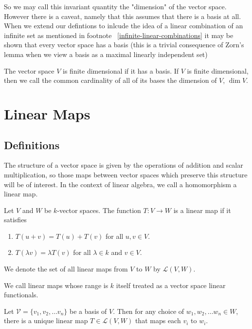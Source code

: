 \documentclass[]{article}
\begin{document}
So we may call this invariant quantity the "dimension" of the vector space. However there is a caveat, namely that this assumes that there is a basis at all. When we extend our defintions to inlcude the idea of a linear combination of an infinite set as mentioned in footnote ~\ref{infinite-linear-combinations} it may be shown that every vector space has a basis (this is a trivial consequence of Zorn's lemma when we view a basis as a maximal linearly independent set)

\begin{defi} [Dimension]
		The vector space $V$ is finite dimensional if it has a basis.
		If $V$ is finite dimensional, then we call the common cardinality of all of its bases the dimension of $V$, $\dim V$.
\end{defi}

\section{Linear Maps}

\subsection{Definitions}

The structure of a vector space is given by the operations of addition and scalar multiplication, so those maps between vector spaces which preserve this structure will be of interest. In the context of linear algebra, we call a homomorphism a linear map.

\begin{defi} 
		Let $V$ and $W$ be $k$-vector spaces. The function $T: V \to W$ is a linear map if it satisfies
		\begin{enumerate}
				\item $T(u + v) = T(u) + T(v)$ for all $u, v \in V$.
				\item $T(\lambda v) = \lambda T(v)$ for all $\lambda \in k$ and $v \in V$.
		\end{enumerate}

		We denote the set of all linear maps from $V$ to $W$ by $\mathcal{L}(V,W)$.

		We call linear maps whose range is $k$ itself treated as a vector space linear functionals.
\end{defi}

\begin{thm}
		Let $\mathcal{V} = \{v_1, v_2, \ldots v_n\}$ be a basis of $V$. Then for any choice of $w_1, w_2, \ldots w_n \in W$, there is a unique linear map $T \in \mathcal{L}(V,W)$ that maps each $v_i$ to $w_i$.
\end{thm}
\end{document}
